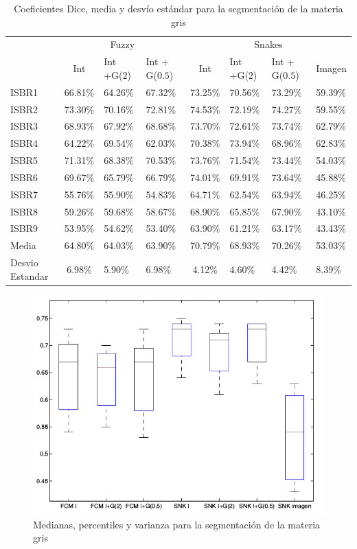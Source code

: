 \begin{table}[h]
		\centering
	\begin{tabular}{l|cll|clll}
		& \multicolumn{3}{c|}{Fuzzy} & \multicolumn{4}{c}{Snakes} \\ \cline{2-8} 
		& Int & Int +G($2$) & Int + G($0.5$) & Int & Int +G($2$) & Int + G($0.5$) & Imagen \\ \hline
		ISBR1 & 66.81\% & 64.26\% & 67.32\% & 73.25\% & 70.56\% & 73.29\% & 59.39\% \\
		ISBR2 & 73.30\% & 70.16\% & 72.81\% & 74.53\% & 72.19\% & 74.27\% & 59.55\% \\
		ISBR3 & 68.93\% & 67.92\% & 68.68\% & 73.70\% & 72.61\% & 73.74\% & 62.79\% \\
		ISBR4 & 64.22\% & 69.54\% & 62.03\% & 70.38\% & 73.94\% & 68.96\% & 62.83\% \\
		ISBR5 & 71.31\% & 68.38\% & 70.53\% & 73.76\% & 71.54\% & 73.44\% & 54.03\% \\
		ISBR6 & 69.67\% & 65.79\% & 66.79\% & 74.01\% & 69.91\% & 73.64\% & 45.88\% \\
		ISBR7 & 55.76\% & 55.90\% & 54.83\% & 64.71\% & 62.54\% & 63.94\% & 46.25\% \\
		ISBR8 & 59.26\% & 59.68\% & 58.67\% & 68.90\% & 65.85\% & 67.90\% & 43.10\% \\
		ISBR9 & 53.95\% & 54.62\% & 53.40\% & 63.90\% & 61.21\% & 63.17\% & 43.43\% \\ \hline
		Media & 64.80\% & 64.03\% & 63.90\% & 70.79\% & 68.93\% & 70.26\% & 53.03\% \\ \hline
		Desvio Estandar & 6.98\% & 5.90\% & 6.98\% & 4.12\% & 4.60\% & 4.42\% & 8.39\%
	\end{tabular}
	\caption{Coeficientes Dice, media y desvío estándar para la segmentación de la materia gris}
	\label{table:resultados_gris}
\end{table}

\begin{figure}[H]
	\centering
	\includegraphics[scale=0.5]{images/BoxPlotMG.png}
	\caption{Medianas, percentiles y varianza para la segmentación de la materia gris}
	\label{fig:boxplotMG}
\end{figure}

